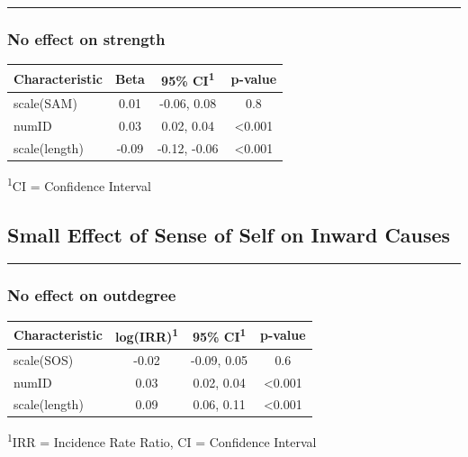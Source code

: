 \documentclass[
  .7em,
  letterpaper,
  DIV=11,
  numbers=noendperiod]{scrartcl}
\begin{document}
\begin{center}\rule{0.5\linewidth}{0.5pt}\end{center}

\hypertarget{no-effect-on-strength-2}{%
\subsubsection{No effect on strength}\label{no-effect-on-strength-2}}

\captionsetup[table]{labelformat=empty,skip=1pt}
\setlength{\LTpost}{0mm}
\begin{longtable}{lccc}
\toprule
\textbf{Characteristic} & \textbf{Beta} & \textbf{95\% CI}\textsuperscript{1} & \textbf{p-value} \\ 
\midrule
scale(SAM) & 0.01 & -0.06, 0.08 & 0.8 \\ 
numID & 0.03 & 0.02, 0.04 & <0.001 \\ 
scale(length) & -0.09 & -0.12, -0.06 & <0.001 \\ 
\bottomrule
\end{longtable}
\begin{minipage}{\linewidth}
\textsuperscript{1}CI = Confidence Interval\\
\end{minipage}

\hypertarget{small-effect-of-sense-of-self-on-inward-causes}{%
\subsection{Small Effect of Sense of Self on Inward
Causes}\label{small-effect-of-sense-of-self-on-inward-causes}}

\begin{center}\rule{0.5\linewidth}{0.5pt}\end{center}

\hypertarget{no-effect-on-outdegree-5}{%
\subsubsection{No effect on outdegree}\label{no-effect-on-outdegree-5}}

\captionsetup[table]{labelformat=empty,skip=1pt}
\setlength{\LTpost}{0mm}
\begin{longtable}{lccc}
\toprule
\textbf{Characteristic} & \textbf{log(IRR)}\textsuperscript{1} & \textbf{95\% CI}\textsuperscript{1} & \textbf{p-value} \\ 
\midrule
scale(SOS) & -0.02 & -0.09, 0.05 & 0.6 \\ 
numID & 0.03 & 0.02, 0.04 & <0.001 \\ 
scale(length) & 0.09 & 0.06, 0.11 & <0.001 \\ 
\bottomrule
\end{longtable}
\begin{minipage}{\linewidth}
\textsuperscript{1}IRR = Incidence Rate Ratio, CI = Confidence Interval\\
\end{minipage}
\end{document}
